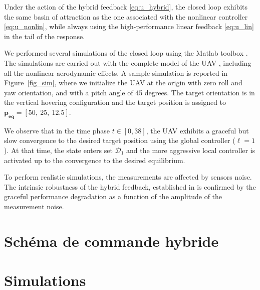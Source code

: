 \begin{proposition}
  Under the action of the hybrid feedback \eqref{eq:u_hybrid}, the closed loop exhibits the same basin of attraction as the one associated with the nonlinear controller \eqref{eq:u_nonlin}, while always using the high-performance linear feedback \eqref{eq:u_lin} in the tail of the response.
\end{proposition}

We performed several simulations of the closed loop using the Matlab toolbox \cite{sanfelice_2017}. The simulations are carried out with the complete model of the UAV \cite{sansou:stage}, including all the nonlinear aerodynamic effects. A sample simulation is reported in Figure~\ref{fig_sim}, where we initialize the UAV at the origin with zero roll and yaw orientation, and with a pitch angle of 45 degrees. The target orientation is in the vertical hovering configuration and the target position is assigned to $\boldsymbol{p_{\text{eq}}} = [50,~25,~12.5]$.

We observe that in the time phase $t \in \left[0,38\right]$, the UAV
exhibits a graceful but slow convergence to the desired target position using the global controller ($\ell=1$). At that time, the state enters set $\mathcal{D}_1$ and the more aggressive local controller is activated up to the convergence to the desired equilibrium.

To perform realistic simulations, the measurements are affected by 
sensors noise. The intrinsic robustness of the hybrid feedback, established in \cite[Chapter 7]{65} is confirmed by the graceful performance degradation as a function of the amplitude of the measurement noise.

\section{Schéma de commande hybride}

\section{Simulations}






